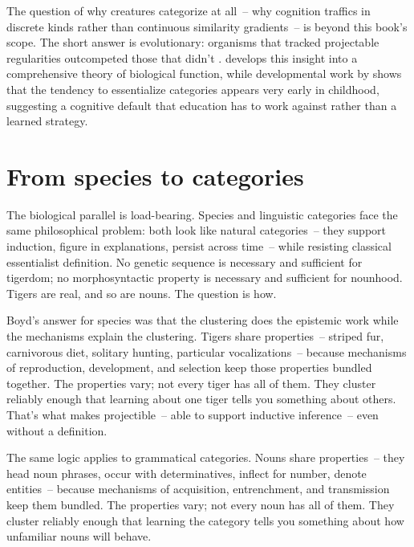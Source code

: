 The question of why creatures categorize at all~-- why cognition traffics in discrete kinds rather than continuous similarity gradients~-- is beyond this book's scope. The short answer is evolutionary: organisms that tracked projectable regularities outcompeted those that didn't \citep{quine1969}. \textcite{millikan1984} develops this insight into a comprehensive theory of biological function, while developmental work by \textcite{gelman1987} shows that the tendency to essentialize categories appears very early in childhood, suggesting a cognitive default that education has to work against rather than a learned strategy.


\section{From species to categories}
\label{sec:4:species-to-categories}

The biological parallel is load-bearing. Species and linguistic categories face the same philosophical problem: both look like natural categories~-- they support induction, figure in explanations, persist across time~-- while resisting classical essentialist definition. No genetic sequence is necessary and sufficient for tigerdom; no morphosyntactic property is necessary and sufficient for nounhood. Tigers are real, and so are nouns. The question is how.

Boyd's answer for species was that the clustering does the epistemic work while the mechanisms explain the clustering. Tigers share properties~-- striped fur, carnivorous diet, solitary hunting, particular vocalizations~-- because mechanisms of reproduction, development, and selection keep those properties bundled together. The properties vary; not every tiger has all of them. They cluster reliably enough that learning about one tiger tells you something about others. That's what makes  projectible~-- able to support inductive inference~-- even without a definition.

The same logic applies to grammatical categories. Nouns share properties~-- they head noun phrases, occur with determinatives, inflect for number, denote entities~-- because mechanisms of acquisition, entrenchment, and transmission keep them bundled. The properties vary; not every noun has all of them. They cluster reliably enough that learning the category  tells you something about how unfamiliar nouns will behave.

